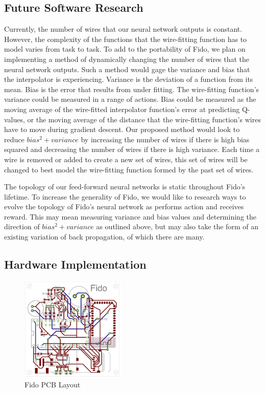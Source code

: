 \subsection{Future Software Research}

Currently, the number of wires that our neural network outputs is constant. However, the complexity of the functions that the wire-fitting function has to model varies from task to task. To add to the portability of Fido, we plan on implementing a method of dynamically changing the number of wires that the neural network outputs. Such a method would gage the variance and bias that the interpolator is experiencing. Variance is the deviation of a function from its mean. Bias is the error that results from under fitting. The wire-fitting function's variance could be measured in a range of actions. Bias could be measured as the moving average of the wire-fitted interpolator function's error at predicting Q-values, or the moving average of the distance that the wire-fitting function's wires have to move during gradient descent. Our proposed method would look to reduce $bias^2 + variance$ by increasing the number of wires if there is high bias squared and decreasing the number of wires if there is high variance. Each time a wire is removed or added to create a new set of wires, this set of wires will be changed to best model the wire-fitting function formed by the past set of wires.

The topology of our feed-forward neural networks is static throughout Fido's lifetime. To increase the generality of Fido, we would like to research ways to evolve the topology of Fido's neural network as performs action and receives reward. This may mean measuring variance and bias values and determining the direction of $bias^2 + variance$ as outlined above, but may also take the form of an existing variation of back propagation, of which there are many.

\subsection{Hardware Implementation}

\begin{figure}[ht]
	\centering
	\includegraphics[height=5cm]{Figures/boardLayout.png}
	\caption{Fido PCB Layout}
\end{figure}

